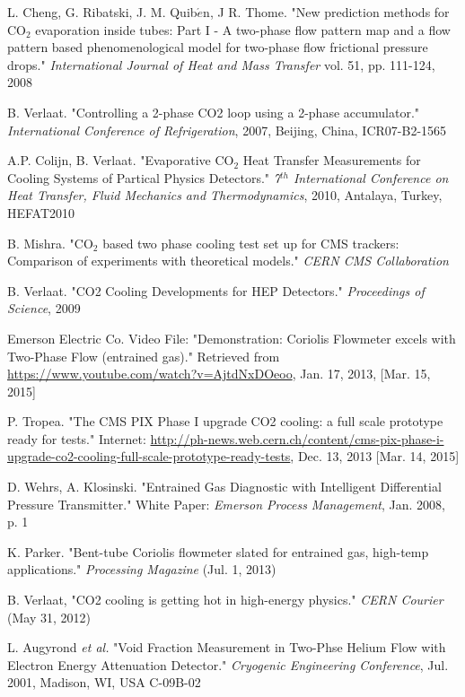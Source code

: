 \documentclass{report}
\begin{document}
\begin{thebibliography}{9}
L. Cheng, G. Ribatski, J. M. Quib$\acute{e}$n, J R. Thome. "New prediction methods for CO$_2$ evaporation inside tubes: Part I - A two-phase flow pattern map and a flow pattern based phenomenological model for two-phase flow frictional pressure drops." \textit{International Journal of Heat and Mass Transfer} vol. 51, pp. 111-124, 2008

B. Verlaat. "Controlling a 2-phase CO2 loop using a 2-phase accumulator." \textit{International Conference of Refrigeration}, 2007, Beijing, China, ICR07-B2-1565 

A.P. Colijn, B. Verlaat. "Evaporative CO$_2$ Heat Transfer Measurements for Cooling Systems of Partical Physics Detectors." \textit{7$^{
th}$ International Conference on Heat Transfer, Fluid Mechanics and Thermodynamics}, 2010, Antalaya, Turkey, HEFAT2010 

B. Mishra. "CO$_2$ based two phase cooling test set up for CMS trackers: Comparison of experiments with theoretical models." \textit{CERN CMS Collaboration}

B. Verlaat. "CO2 Cooling Developments for HEP Detectors." \textit{Proceedings of Science}, 2009

Emerson Electric Co. Video File: "Demonstration: Coriolis Flowmeter excels with Two-Phase Flow (entrained gas)." Retrieved from \underline{https://www.youtube.com/watch?v=AjtdNxDOeoo}, Jan. 17, 2013, [Mar. 15, 2015]

P. Tropea. "The CMS PIX Phase I upgrade CO2 cooling: a full scale prototype ready for tests." Internet: \underline{http://ph-news.web.cern.ch/content/cms-pix-phase-i-upgrade-co2-cooling-full-scale-prototype-ready-tests}, Dec. 13, 2013 [Mar. 14, 2015] 

D. Wehrs, A. Klosinski. "Entrained Gas Diagnostic with Intelligent Differential Pressure Transmitter." White Paper: \textit{Emerson Process Management}, Jan. 2008, p. 1

K. Parker. "Bent-tube Coriolis flowmeter slated for entrained gas, high-temp applications." \textit{Processing Magazine} (Jul. 1, 2013)

B. Verlaat, "CO2 cooling is getting hot in high-energy physics." \textit{CERN Courier} (May 31, 2012)

L. Augyrond \textit{et al.} "Void Fraction Measurement in Two-Phse Helium Flow with Electron Energy Attenuation Detector." \textit{Cryogenic Engineering Conference}, Jul. 2001, Madison, WI, USA C-09B-02


\end{thebibliography}
\end{document}
